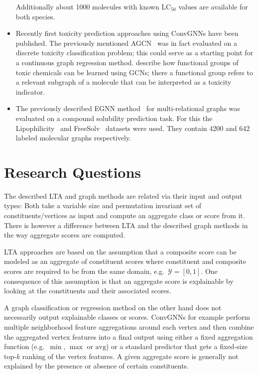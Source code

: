 \documentclass[12pt]{scrartcl}
\begin{document}
\begin{itemize}
		Additionally about 1000 molecules with known $\text{LC}_{50}$ values are available for both species.
	\item Recently first toxicity prediction approaches using ConvGNNs have been published.
		The previously mentioned AGCN~\cite{Li2018} was in fact evaluated on a discrete toxicity classification problem;
		this could serve as a starting point for a continuous graph regression method.
		\citet{Pope2018} describe how functional groups of toxic chemicals can be learned using GCNs;
		there a functional group refers to a relevant subgraph of a molecule that can be interpreted as a toxicity indicator.
	\item The previously described EGNN method~\cite{Gong2018} for multi-relational graphs was evaluated on a compound solubility prediction task.
		For this the Lipophil\-icity~\cite{Wu2017} and FreeSolv~\cite{Mobley2014} datasets were used.
		They contain 4200 and 642 labeled molecular graphs respectively.
\end{itemize}

\section{Research Questions}%
\label{sec:question}

The described LTA and graph methods are related via their input and output types:
Both take a variable size and permutation invariant set of constituents/vertices as input and compute an aggregate class or score from it.
There is however a difference between LTA and the described graph methods in the way aggregate scores are computed.

LTA approaches are based on the assumption that a composite score can be modeled as an aggregate of constituent scores where constituent and composite scores are required to be from the same domain, e.g.\ $\mathcal{Y} = [0, 1]$.
One consequence of this assumption is that an aggregate score is explainable by looking at the constituents and their associated scores.

A graph classification or regression method on the other hand does not necessarily output explainable classes or scores.
ConvGNNs for example perform multiple neighborhood feature aggregations around each vertex and then combine the aggregated vertex features into a final output using either a fixed aggregation function (e.g.\ $\min$, $\max$ or $\text{avg}$) or a standard predictor that gets a fixed-size top-$k$ ranking of the vertex features.
A given aggregate score is generally not explained by the presence or absence of certain constituents.
\end{document}
